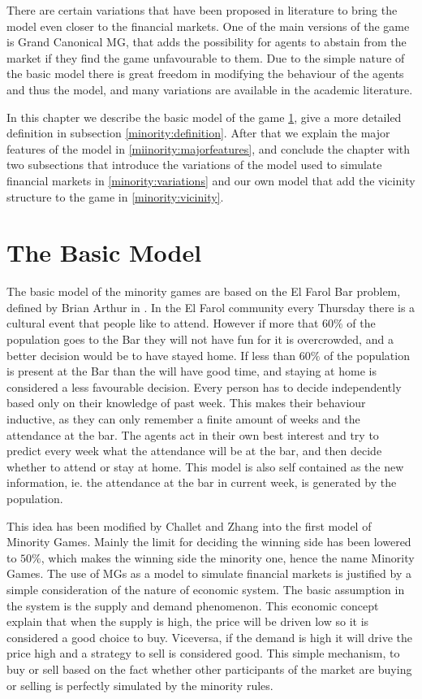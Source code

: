 There are certain variations that have been proposed in literature to bring the model even closer to the financial markets.
One of the main versions of the game is Grand Canonical MG, that adds the possibility for agents to abstain from the market if they find the game unfavourable to them.
Due to the simple nature of the basic model there is great freedom in modifying the behaviour of the agents and thus the model, and many variations are available in the academic literature.

In this chapter we describe the basic model of the game \ref{minority:basicmodel}, give a more detailed definition in subsection \ref{minority:definition}. After that we explain the major features of the model in \ref{miinority:majorfeatures}, and conclude the chapter with two subsections that introduce the variations of the model used to simulate financial markets in \ref{minority:variations} and our own model that add the vicinity structure to the game in \ref{minority:vicinity}.

\section{The Basic Model}
\label{minority:basicmodel}

The basic model of the minority games are based on the El Farol Bar problem, defined by Brian Arthur in \cite{arthur1994inductive}.
In the El Farol community every Thursday there is a cultural event that people like to attend.
However if more that $60\%$ of the population goes to the Bar they will not have fun for it is overcrowded, and a better decision would be to have stayed home.
If less than $60\%$ of the population is present at the Bar than the will have good time, and staying at home is considered a less favourable decision.
Every person has to decide independently based only on their knowledge of past week.
This makes their behaviour inductive, as they can only remember a finite amount of weeks and the attendance at the bar.
The agents act in their own best interest and try to predict every week what the attendance will be at the bar, and then decide whether to attend or stay at home.
This model is also self contained as the new information, ie. the attendance at the bar in current week, is generated by the population.

This idea has been modified by Challet and Zhang into the first model of Minority Games.
Mainly the limit for deciding the winning side has been lowered to $50\%$, which makes the winning side the minority one, hence the name Minority Games.
The use of MGs as a model to simulate financial markets is justified by a simple consideration of the nature of economic system.
The basic assumption in the system is the supply and demand phenomenon.
This economic concept explain that when the supply is high, the price will be driven low so it is considered a good choice to buy.
Viceversa, if the demand is high it will drive the price high and a strategy to sell is considered good.
This simple mechanism, to buy or sell based on the fact whether other participants of the market are buying or selling is perfectly simulated by the minority rules.

